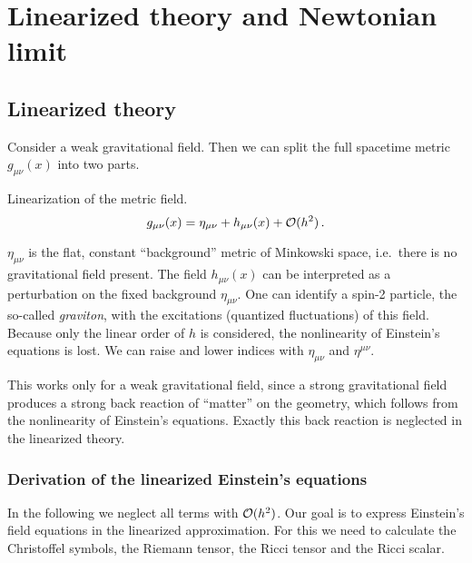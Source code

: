 \chapter{Linearized theory and Newtonian limit}
\section{Linearized theory}
Consider a weak gravitational field. Then we can split the full spacetime metric $g_{\mu\nu}(x)$ into two parts.
\begin{definition}{Linearization of the metric field.}
\begin{equation}
    g_{\mu\nu}(x) = \eta_{\mu\nu} + h_{\mu\nu}(x) + \mathcal{O}(h^2) \, .
\end{equation}
\end{definition}
$\eta_{\mu\nu}$ is the flat, constant ``background'' metric of Minkowski space, i.e.\ there is no gravitational field present.
The field $h_{\mu\nu}(x)$ can be interpreted as a perturbation on the fixed background $\eta_{\mu\nu}$.
One can identify a spin-2 particle, the so-called \emph{graviton}, with the excitations (quantized fluctuations) of this field.
Because only the linear order of $h$ is considered, the nonlinearity of Einstein's equations is lost.
We can raise and lower indices with $\eta_{\mu\nu}$ and $\eta^{\mu\nu}$.

\begin{remark}
This works only for a weak gravitational field, since a strong gravitational field produces a strong back reaction of ``matter''
on the geometry, which follows from the nonlinearity of Einstein's equations.
Exactly this back reaction is neglected in the linearized theory.
\end{remark}

\subsection{Derivation of the linearized Einstein's equations}
In the following we neglect all terms with $\mathcal{O}(h^2)$.
Our goal is to express Einstein's field equations in the linearized approximation.
For this we need to calculate the Christoffel symbols, the Riemann tensor, the Ricci tensor and the Ricci scalar.

